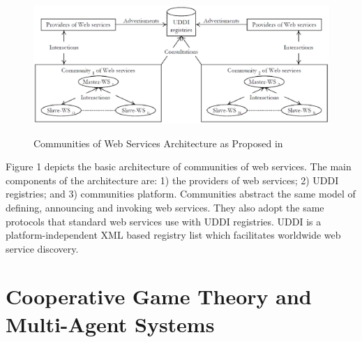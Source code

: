        \begin{figure}
            \begin{center}
            \includegraphics[width=16cm]{Figures/wsarch.eps}\label{wsarch}
            \caption{Communities of Web Services Architecture as Proposed in \cite{DBLP:journals/ijebr/MaamarSTBB09}}
            \end{center}
        \end{figure}

Figure 1 %
depicts the basic architecture of
communities of web services. The main components of the
architecture are: 1) the providers of web services; 2) UDDI
registries; and 3) communities platform. Communities abstract the
same model of defining, announcing and invoking web services. They
also adopt the same protocols that standard web services use with
UDDI registries. UDDI is a platform-independent XML based registry
list which facilitates worldwide web service discovery.



\section{Cooperative Game Theory and Multi-Agent Systems}\label{sec:CGTMS}

